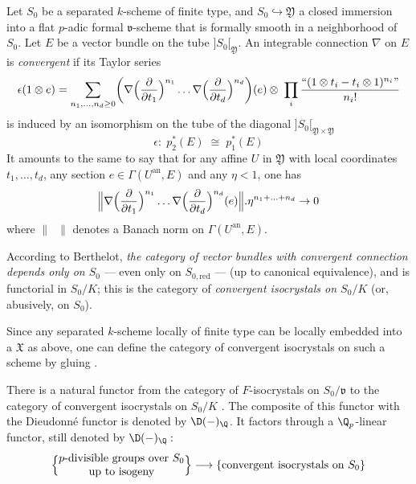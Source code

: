 \begin{para}\label{para:3.6.1} Let $S_0$ be a separated $k$-scheme of finite
 type, and $S_0\hookrightarrow \mathfrak{Y}$ a closed immersion into a
 flat $p$-adic formal $\mathfrak{v}$-scheme that is formally smooth in a
 neighborhood of $S_0$. Let $E$ be a vector bundle on the tube
 $]S_0[_{\mathfrak{Y}}$. An integrable connection $\nabla$ on $E$ is
 {\it convergent} if its Taylor series
 \begin{equation*}
  \epsilon(1\otimes e) =
   \sum_{n_1,\ldots,n_d\geq 0}
   \biggl(\nabla\Bigl(\frac{\partial }{\partial t_1}\Bigr)^{n_1}\ldots
   \nabla\Bigl(\frac{\partial }{\partial t_d}\Bigr)^{n_d}\biggr)(e)
   \otimes \;\prod_i\frac{\text{``$(1\otimes t_i-t_i\otimes 1)^{n_i}$''}}{n_i!}
 \end{equation*}
 is induced by an isomorphism on the tube of the
 diagonal $]S_0[_{\mathfrak{Y}\times \mathfrak{Y}}$
 \begin{equation*}
  \epsilon:\; p_2^\ast(E)\;\cong \;p_1^\ast(E)
 \end{equation*} 
 It amounts to the same to say that for any affine $U$ in $\mathfrak{Y}$
 with local coordinates
 $t_1,\ldots, t_d$, any section $e\in \Gamma(U^{\mathrm{an}},E)$ and any $\eta<1$,
 one has 
 \begin{equation*}
  \Bigl\|\nabla\Bigl(\frac{\partial }{\partial t_1}\Bigr)^{n_1}
   \ldots\nabla\Bigl(\frac{\partial }{\partial t_d}\Bigr)^{n_d}(e)\Bigr\|.
   \eta^{n_1+\ldots + n_d}\rightarrow 0
 \end{equation*}
 where $\|\;\;\|$ denotes a Banach norm on $\Gamma(U^{\mathrm{an}},E)$.

 According to Berthelot, {\it the category of vector bundles
with convergent connection depends only on $S_0$} --- even only on
$S_{0,\mathrm{red}}$ --- (up to canonical equivalence), and is functorial in
$S_0/K$; this is the category of {\it convergent isocrystals on $S_0/K$}
(or, abusively, on $S_0$).
 

Since any separated $k$-scheme locally of finite type can be locally
embedded into a $\mathfrak{X}$ as above, one can define the category of
convergent isocrystals on such a scheme by gluing \cite[2.3.2]{crecrasp}.
\end{para}

\begin{para}\label{para:3.6.2} There is a natural functor from the category
 of $F$-isocrystals on $S_0/\mathfrak{v}$ to the category of 
convergent isocrystals on $S_0/K$ \cite[2.4]{crecrasp}.  The composite of
this functor with the Dieudonn\'e functor is denoted by $\D(-)_\Q$. It
factors through a $\Q_p$-linear functor, still denoted by $\D(-)_\Q:\;$
\begin{equation*}
\Bigl\{\begin{matrix}
	\text{$p$-divisible groups over $S_0$}\\
	\text{up to isogeny}
       \end{matrix}\Bigr\}
 \longrightarrow
 \{\text{convergent isocrystals on $S_0$}\}
\end{equation*}
\end{para}

